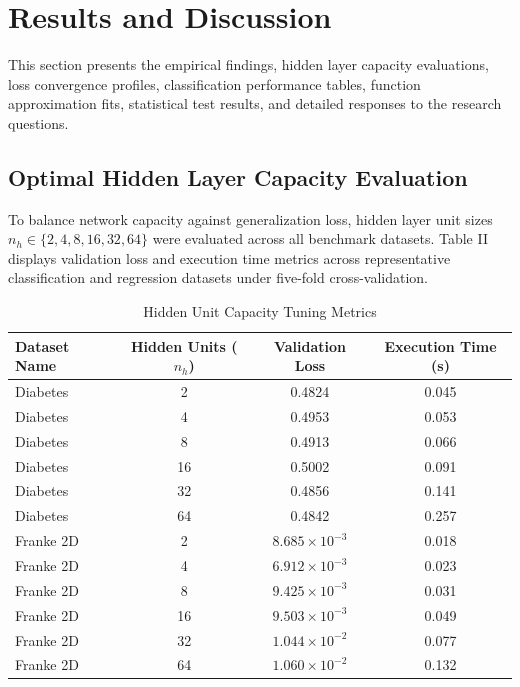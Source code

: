 \documentclass[10pt, conference]{IEEEtran}
\begin{document}
\section{Results and Discussion}

This section presents the empirical findings, hidden layer capacity evaluations, loss convergence profiles, classification performance tables, function approximation fits, statistical test results, and detailed responses to the research questions.

\subsection{Optimal Hidden Layer Capacity Evaluation}

To balance network capacity against generalization loss, hidden layer unit sizes $n_h \in \{2, 4, 8, 16, 32, 64\}$ were evaluated across all benchmark datasets. Table II displays validation loss and execution time metrics across representative classification and regression datasets under five-fold cross-validation.

\begin{table}[t]
\caption{Hidden Unit Capacity Tuning Metrics}
\label{tab:hidden_tuning}
\centering
\footnotesize
\setlength{\tabcolsep}{3.5pt}
\begin{tabular}{l c c c}
\toprule
Dataset Name & Hidden Units ($n_h$) & Validation Loss & Execution Time (s) \\
\midrule
Diabetes & 2 & 0.4824 & 0.045 \\
Diabetes & 4 & 0.4953 & 0.053 \\
Diabetes & 8 & 0.4913 & 0.066 \\
Diabetes & 16 & 0.5002 & 0.091 \\
Diabetes & 32 & 0.4856 & 0.141 \\
Diabetes & 64 & 0.4842 & 0.257 \\
\midrule
Franke 2D & 2 & $8.685 \times 10^{-3}$ & 0.018 \\
Franke 2D & 4 & $6.912 \times 10^{-3}$ & 0.023 \\
Franke 2D & 8 & $9.425 \times 10^{-3}$ & 0.031 \\
Franke 2D & 16 & $9.503 \times 10^{-3}$ & 0.049 \\
Franke 2D & 32 & $1.044 \times 10^{-2}$ & 0.077 \\
Franke 2D & 64 & $1.060 \times 10^{-2}$ & 0.132 \\
\bottomrule
\end{tabular}
\end{table}
\end{document}
